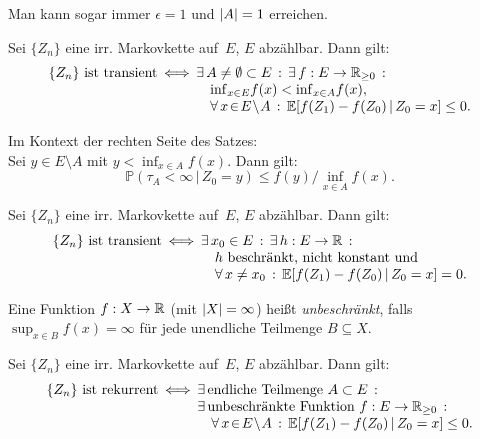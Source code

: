\documentclass{cheat-sheet}
\renewcommand{\P}{\mathbb{P}} %
\newcommand{\E}{\mathbb{E}} %
\begin{document}
\begin{bem}
  Man kann sogar immer $\epsilon = 1$ und $\lvert A\rvert = 1$ erreichen.
\end{bem}

\begin{satz}
  Sei $\{ Z_n \}$ eine irr. Markovkette auf~$E$, $E$ abzählbar.
  Dann gilt:
  \[
    \arraycolsep=1pt
    \begin{array}{r c l}
      \{ Z_n \} \text{ ist transient}
      &\iff&
      \ex{A \neq \emptyset \subset E} \ex{f : E \to \R_{\geq 0}} \\
      && \quad {\inf}_{x \in E} f(x) < {\inf}_{x \in A} f(x), \\
      && \quad \fa{x \!\in\! E \!\setminus\! A} \E[ f(Z_1) - f(Z_0) \,|\, Z_0 = x ] \leq 0.
    \end{array}
  \]
\end{satz}

\begin{lem}
  \begin{minipage}[t]{0.8 \linewidth}
    Im Kontext der rechten Seite des Satzes: \\
    Sei $y \in E \setminus A$ mit $y < {\inf}_{x \in A} f(x)$.
    Dann gilt:
    \[
      \P(\tau_A < \infty \,|\, Z_0 = y) \leq f(y) / {\inf}_{x \in A} f(x).
    \]
  \end{minipage}
\end{lem}

\begin{kor}
  Sei $\{ Z_n \}$ eine irr. Markovkette auf~$E$, $E$ abzählbar.
  Dann gilt:
  \[
    \arraycolsep=1pt
    \begin{array}{r c l}
      \{ Z_n \} \text{ ist transient}
      &\iff&
      \ex{x_0 \in E} \ex{h : E \to \R} \\
      && \quad \text{$h$ beschränkt, nicht konstant und} \\
      && \quad \fa{x \neq x_0} \E[ f(Z_1) - f(Z_0) \,|\, Z_0 = x ] = 0.
    \end{array}
  \]
\end{kor}

\begin{defn}
  Eine Funktion $f : X \to \mathbb{R}$ (mit $\lvert X\rvert = \infty$) heißt \emph{unbeschränkt}, falls ${\sup}_{x \in B} f(x) = \infty$ für jede unendliche Teilmenge $B \subseteq X$.
\end{defn}

\begin{satz}
  Sei $\{ Z_n \}$ eine irr. Markovkette auf~$E$, $E$ abzählbar.
  Dann gilt:
  \[
    \arraycolsep=1pt
    \begin{array}{r c l}
      \{ Z_n \} \text{ ist rekurrent}
      &\iff&
      \ex{\text{endliche Teilmenge } A \subset E} \\
      && \ex{\text{unbeschränkte Funktion } f : E \to \R_{\geq 0}} \\
      && \quad \fa{x \!\in\! E \!\setminus\! A} \E[ f(Z_1) - f(Z_0) \,|\, Z_0 = x ] \leq 0.
    \end{array}
  \]
\end{satz}
\end{document}

